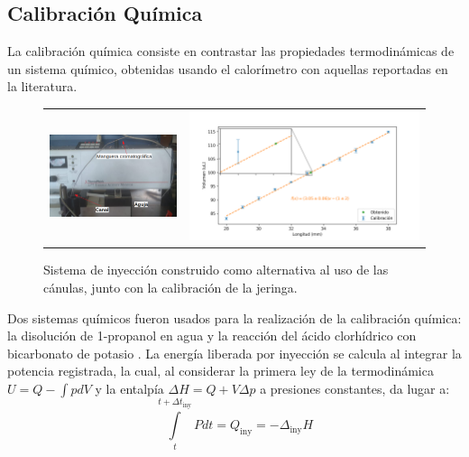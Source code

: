 \documentclass[a0]{sciposter}
\begin{document}
\begin{multicols}{3}
\section{Calibraci\'on Qu\'imica}
	La calibraci\'on qu\'imica consiste en contrastar las propiedades termodin\'amicas de un sistema qu\'imico, obtenidas usando el calor\'imetro con aquellas reportadas en la literatura. 
	\begin{figure}[h]
		\centering
		\begin{tabular}{cc}
			\includegraphics[width=0.4\linewidth]{../Tesis/Figures/sistemaInyeccion} & 
			\includegraphics[width=0.6\linewidth]{../Data/Syringe/syringe_cal.png}
		\end{tabular}
		\caption{Sistema de inyección construido como alternativa al uso de las cánulas, junto con la calibración de la jeringa.}
	\end{figure}

	Dos sistemas qu\'imicos fueron usados para la realizaci\'on de la calibraci\'on qu\'imica: la disoluci\'on de 1-propanol en agua y la reacci\'on del \'acido clorhídrico con bicarbonato de potasio \cite{demarse2011calibration, adao2012chemical, nanoitc}. La energía liberada por inyección se calcula al integrar la potencia registrada, la cual, al considerar la primera ley de la termodinámica $U = Q-\int pdV$ y la entalpía $\Delta H = Q + V\Delta p$ a presiones constantes, da lugar a:
	\begin{equation}
		\int\limits_t^{t+\Delta t_\text{iny}} Pdt = Q_\text{iny} = -\Delta_\text{iny}H
	\end{equation}


\end{multicols}
\end{document}
